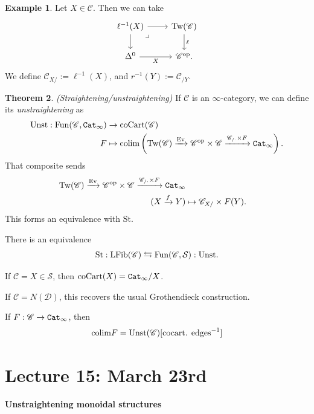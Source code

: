 \documentclass[12pt]{amsart}
\theoremstyle{definition}
\newtheorem{theorem}{Theorem}[section]
\newtheorem{example}[theorem]{Example}
\providecommand{\St}{\text{St}}
\providecommand{\Unst}{\text{Unst}}
\providecommand{\coCart}{\text{coCart}}
\providecommand{\Tw}{\text{Tw}}
\providecommand{\Ev}{\text{Ev}}
\providecommand{\LFib}{\text{LFib}}
\begin{document}
\begin{example} Let $X \in \mathscr{C}$. Then we can take
\[ \begin{tikzcd}
    \ell^{-1}(X)\rar\dar\pb & \Tw(\mathscr{C})\dar["\ell" right]\\
    \Delta^0\rar["X" below] & \mathscr{C}^\op.
\end{tikzcd} \]
We define $\mathscr{C}_{X/} := \ell^{-1}(X)$, and $r^{-1}(Y):=\mathscr{C}_{/Y}$.
\end{example}

\begin{theorem} \textit{(Straightening/unstraightening)} If $\mathscr{C}$ is an $\infty$-category, we can define its \textit{unstraightening} as
\begin{align*}
    \Unst: \Fun(\mathscr{C}, \Cat_\infty) &\to \coCart(\mathscr{C}) \\
    F &\mapsto \colim \left( \Tw(\mathscr{C}) \xto{\Ev} \mathscr{C}^\op \times \mathscr{C} \xto{\mathscr{C}_{/\cdot} \times F} \Cat_\infty \right).
\end{align*}
That composite sends
\begin{align*}
    \Tw(\mathscr{C}) \xto{\Ev} \mathscr{C}^\op \times \mathscr{C} \xto{\mathscr{C}_{/\cdot} \times F} \Cat_\infty \\
    (X\xto{f} Y) &\mapsto \mathscr{C}_{X/} \times F(Y).
\end{align*}
This forms an equivalence with $\St$.
\end{theorem}

There is an equivalence
\begin{align*}
    \St: \LFib(\mathscr{C}) \leftrightarrows \Fun(\mathscr{C},\mathcal{S}): \Unst.
\end{align*}

If $\mathscr{C} = X \in \mathcal{S}$, then $\coCart(X) = \Cat_\infty/X$.

If $\mathscr{C} = N(\mathscr{D})$, this recovers the usual Grothendieck construction.

If $F: \mathscr{C}\to \texttt{Cat}_\infty$, then
\begin{align*}
    \colim F &= \Unst(\mathscr{C})[\text{cocart. edges}^{-1}] \\
\end{align*}

\section{Lecture 15: March 23rd}

\begin{center}
    \textbf{Unstraightening monoidal structures}    
\end{center}
\end{document}
